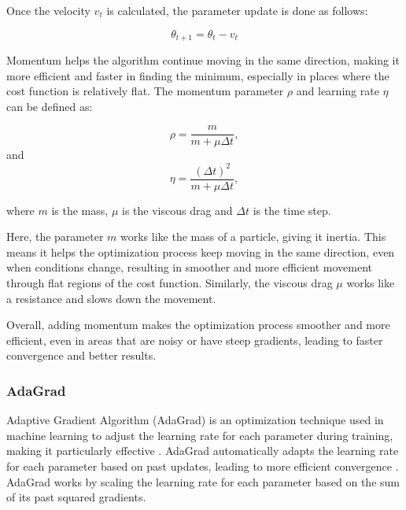 \documentclass{article}
\newcommand{\0}{\mathbf{0}}
\newcommand{\1}{\mathbf{1}}
\begin{document}
Once the velocity \( v_t \) is calculated, the parameter update is done as follows:

\begin{equation}
    \theta_{t+1} = \theta_t - v_t
\end{equation}

Momentum helps the algorithm continue moving in the same direction, making it more efficient and faster in finding the minimum, especially in places where the cost function is relatively flat. The momentum parameter \(\rho\) and learning rate \(\eta\) can be defined as: 

\begin{equation}
    \rho = \frac{m}{m + \mu \Delta t},
\end{equation}
and
\begin{equation}
    \eta = \frac{(\Delta t)^2}{m + \mu \Delta t},
\end{equation}

where \( m \) is the mass, \( \mu \) is the viscous drag and \( \Delta t \) is the time step.

Here, the parameter \(m\) works like the mass of a particle, giving it inertia. This means it helps the optimization process keep moving in the same direction, even when conditions change, resulting in smoother and more efficient movement through flat regions of the cost function. Similarly, the viscous drag \(\mu\) works like a resistance and slows down the movement. 

Overall, adding momentum makes the optimization process smoother and more efficient, even in areas that are noisy or have steep gradients, leading to faster convergence and better results.





\subsubsection{AdaGrad}

Adaptive Gradient Algorithm (AdaGrad) is an optimization technique used in machine learning to adjust the learning rate for each parameter during training, making it particularly effective \cite{soni_adagrad_2023}. AdaGrad automatically adapts the learning rate for each parameter based on past updates, leading to more efficient convergence \cite{soni_adagrad_2023}. AdaGrad works by scaling the learning rate for each parameter based on the sum of its past squared gradients. 
\end{document}
